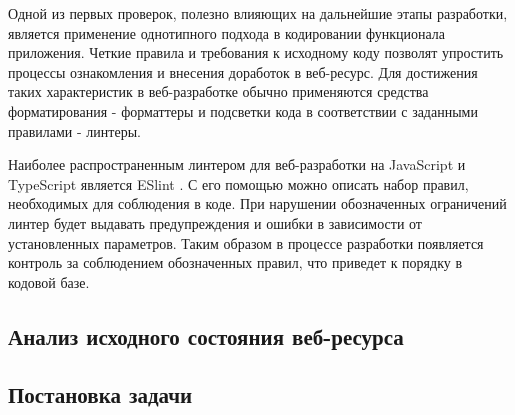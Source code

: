 Одной из первых проверок, полезно влияющих на дальнейшие этапы разработки, является применение однотипного подхода в кодировании функционала приложения.
Четкие правила и требования к исходному коду позволят упростить процессы ознакомления и внесения доработок в веб-ресурс.
Для достижения таких  характеристик в веб-разработке обычно применяются средства форматирования - форматтеры и подсветки кода в соответствии с заданными правилами - линтеры.

Наиболее распространенным линтером для веб-разработки на JavaScript и TypeScript является ESlint \cite{eslint}.
С его помощью можно описать набор правил, необходимых для соблюдения в коде.
При нарушении обозначенных ограничений линтер будет выдавать предупреждения и ошибки в зависимости от установленных параметров.
Таким образом в процессе разработки появляется контроль за соблюдением обозначенных правил, что приведет к порядку в кодовой базе.





\subsection{Анализ исходного состояния веб-ресурса}






\subsection{Постановка задачи}



\clearpage
